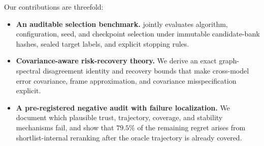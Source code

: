 Our contributions are threefold:
\begin{itemize}
  \item \textbf{An auditable selection benchmark.} \benchmark jointly evaluates
  algorithm, configuration, seed, and checkpoint selection under immutable
  candidate-bank hashes, sealed target labels, and explicit stopping rules.
  \item \textbf{Covariance-aware risk-recovery theory.} We derive an exact
  graph-spectral disagreement identity and recovery bounds that make
  cross-model error covariance, frame approximation, and covariance
  misspecification explicit.
  \item \textbf{A pre-registered negative audit with failure localization.}
  We document which plausible trust, trajectory, coverage, and stability
  mechanisms fail, and show that $79.5\%$ of the remaining regret arises from
  shortlist-internal reranking after the oracle trajectory is already covered.
\end{itemize}
